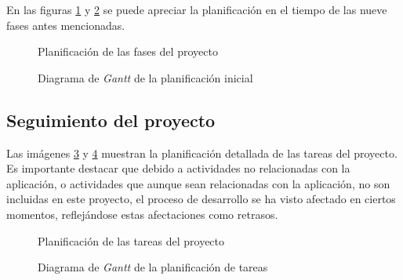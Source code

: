         En las figuras \ref{fig:gantt-initial-tasks} y \ref{fig:gantt-initial-diagram} se puede apreciar la planificación en el tiempo de las nueve fases antes mencionadas.
        
        \begin{figure}[h!]
        \centering
            \caption{Planificación de las fases del proyecto}
            \label{fig:gantt-initial-tasks}
        \end{figure}
        
        \begin{figure}[!h]
        \centering
            \caption{Diagrama de \textit{Gantt} de la planificación inicial}
            \label{fig:gantt-initial-diagram}
        \end{figure}
        
    \subsection{Seguimiento del proyecto}
        
        Las imágenes \ref{fig:gantt-followup-tasks} y \ref{fig:gantt-followup-diagram} muestran la planificación detallada de las tareas del proyecto. Es importante destacar que debido a actividades no relacionadas con la aplicación, o actividades que aunque sean relacionadas con la aplicación, no son incluidas en este proyecto, el proceso de desarrollo se ha visto afectado en ciertos momentos, reflejándose estas afectaciones como retrasos.
        
        \begin{figure}[h!]
        \centering
            \caption{Planificación de las tareas del proyecto}
            \label{fig:gantt-followup-tasks}
        \end{figure}
    
        \begin{figure}[h!]
        \centering
            \caption{Diagrama de \textit{Gantt} de la planificación de tareas}
            \label{fig:gantt-followup-diagram}
        \end{figure}